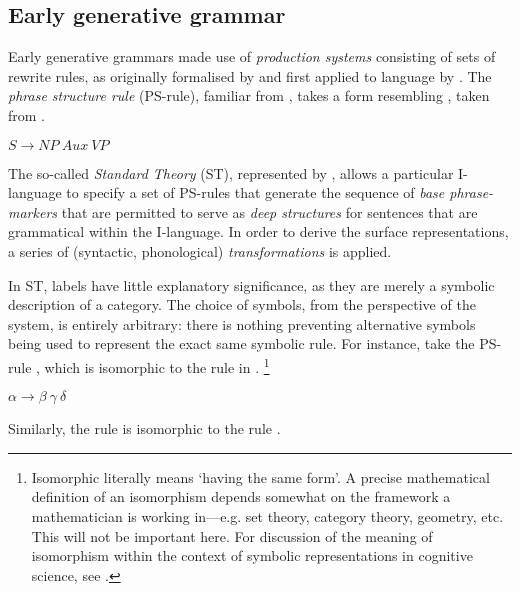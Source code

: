 \subsection{Early generative grammar}\label{sec:210}

Early generative grammars made use of \textit{production systems} consisting of sets of rewrite rules, as originally formalised by \textcite{PostEL_1944} and first applied to language by \textcite{ChomskyN_1951}. The \textit{phrase structure rule} (PS-rule), familiar from \textcite{ChomskyN.MillerGA_1963}, takes a form resembling , taken from \textcite{ChomskyN_1965}.

\begin{example}\label{ex:PSruleS}
$S\rightarrow NP\ Aux\ VP$
\end{example}
%
The so-called \textit{Standard Theory} (ST), represented by \textcite{ChomskyN_1965}, allows a particular I-language to specify a set of PS-rules that generate the sequence of \textit{base phrase-markers} that are permitted to serve as \textit{deep structures} for sentences that are grammatical within the I-language. In order to derive the surface representations, a series of (syntactic, phonological) \textit{transformations} is applied.

In ST, labels have little explanatory significance, as they are merely a symbolic description of a category. The choice of symbols, from the perspective of the system, is entirely arbitrary: there is nothing preventing alternative symbols being used to represent the exact same symbolic rule. For instance, take the PS-rule , which is isomorphic to the rule in .%
\footnote{Isomorphic literally means `having the same form'. A precise mathematical definition of an isomorphism depends somewhat on the framework a mathematician is working in---e.g. set theory, category theory, geometry, etc. This will not be important here. For discussion of the meaning of isomorphism within the context of symbolic representations in cognitive science, see \textcite{GallistelCR_2001}.}

\begin{example}\label{ex:PSrulearb1}
$\alpha\rightarrow \beta\ \gamma\ \delta$
\end{example}
%
Similarly, the rule  is isomorphic to the rule .

